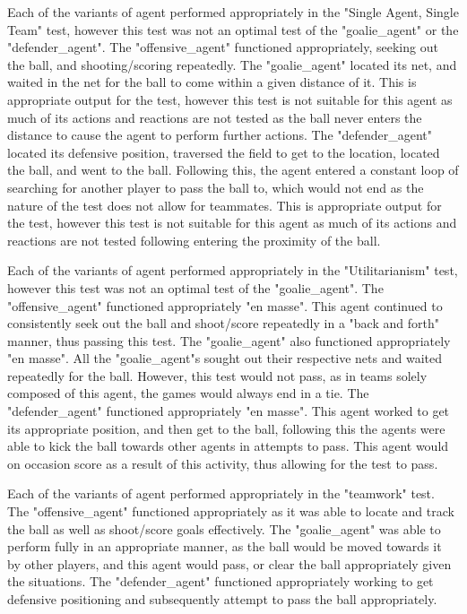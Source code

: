 \documentclass[conference]{IEEEtran}
\begin{document}
Each of the variants of agent performed appropriately in the "Single Agent, Single Team" test, however this test was not an optimal test of the "goalie\_agent" or the "defender\_agent".
The "offensive\_agent" functioned appropriately, seeking out the ball, and shooting/scoring repeatedly.
The "goalie\_agent" located its net, and waited in the net for the ball to come within a given distance of it.
This is appropriate output for the test, however this test is not suitable for this agent as much of its actions and reactions are not tested as the ball never enters the distance to cause the agent to perform further actions.
The "defender\_agent" located its defensive position, traversed the field to get to the location, located the ball, and went to the ball.
Following this, the agent entered a constant loop of searching for another player to pass the ball to, which would not end as the nature of the test does not allow for teammates.
This is appropriate output for the test, however this test is not suitable for this agent as much of its actions and reactions are not tested following entering the proximity of the ball.

Each of the variants of agent performed appropriately in the "Utilitarianism" test, however this test was not an optimal test of the "goalie\_agent".
The "offensive\_agent" functioned appropriately "en masse".
This agent continued to consistently seek out the ball and shoot/score repeatedly in a "back and forth" manner, thus passing this test.
The "goalie\_agent" also functioned appropriately "en masse".
All the "goalie\_agent"s sought out their respective nets and waited repeatedly for the ball.
However, this test would not pass, as in teams solely composed of this agent, the games would always end in a tie.
The "defender\_agent" functioned appropriately "en masse".
This agent worked to get its appropriate position, and then get to the ball, following this the agents were able to kick the ball towards other agents in attempts to pass.
This agent would on occasion score as a result of this activity, thus allowing for the test to pass.

Each of the variants of agent performed appropriately in the "teamwork" test.
The "offensive\_agent" functioned appropriately as it was able to locate and track the ball as well as shoot/score goals effectively.
The "goalie\_agent" was able to perform fully in an appropriate manner, as the ball would be moved towards it by other players, and this agent would pass, or clear the ball appropriately given the situations.
The "defender\_agent" functioned appropriately working to get defensive positioning and subsequently attempt to pass the ball appropriately.
\end{document}
